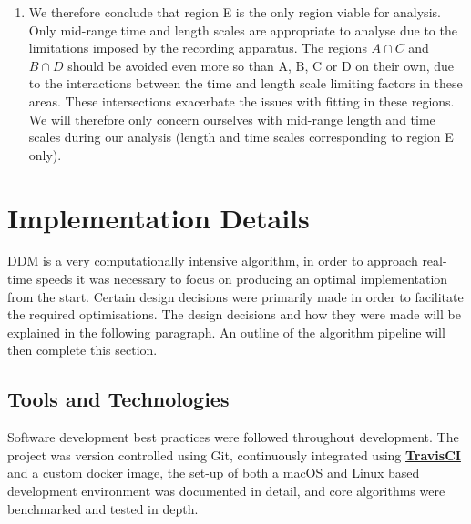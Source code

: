 \documentclass[10pt]{article}
\let\oldhref\href
\renewcommand{\href}[2]{\oldhref{#1}{\bfseries#2}}
\begin{document}
\begin{enumerate}[label=(\Alph*)]
\item We therefore conclude that region E is the only region viable for analysis. Only mid-range time and length scales are appropriate to analyse due to the limitations imposed by the recording apparatus. The regions $A \cap C$ and $B \cap D$ should be avoided even more so than A, B, C or D on their own, due to the interactions between the time and length scale limiting factors in these areas. These intersections exacerbate the issues with fitting in these regions. We will therefore only concern ourselves with mid-range length and time scales during our analysis (length and time scales corresponding to region E only).
\end{enumerate}
\clearpage
\section{Implementation Details}
\label{section:implementation}

DDM is a very computationally intensive algorithm, in order to approach real-time speeds it was necessary to focus on producing an optimal implementation from the start. Certain design decisions were primarily made in order to facilitate the required optimisations. The design decisions and how they were made will be explained in the following paragraph. An outline of the algorithm pipeline will then complete this section.

\subsection{Tools and Technologies}
Software development best practices were followed throughout development. The project was version controlled using Git, continuously integrated using \href{https://travis-ci.com}{TravisCI} and a custom docker image, the set-up of both a macOS and Linux based development environment was documented in detail, and core algorithms were benchmarked and tested in depth.
\end{document}
